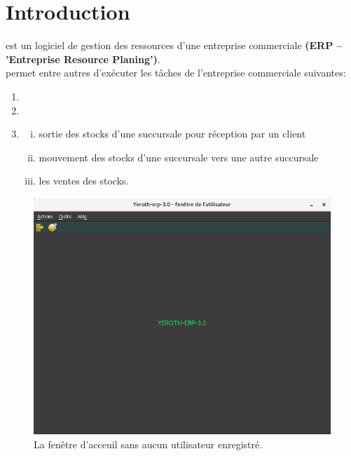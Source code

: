 \chapter{Introduction}\label{chap:introduction}

\yeren est un logiciel de gestion des ressources
d'une entreprise commerciale \textbf{(ERP -- 'Entreprise Resource
Planing')}.\\

\yeren permet entre autres d'ex\'ecuter les t\^aches de l'entreprise
commerciale suivantes:
\begin{enumerate}[1)]
	\item {}	
	\item {}
	\item {}
	\begin{enumerate}[(i)]
		\item {} sortie
			des stocks d'une succursale pour
			r\'eception par un client
		\item {} 
			mouvement des stocks d'une succursale
			vers une autre succursale			
		\item les ventes des stocks.\\
	\end{enumerate}
\end{enumerate} 


\begin{figure}[!htbp]
\centering
\includegraphics[scale=0.63]{images/yeren-fenetre-principale.png}
\caption{La fen\^etre d'acceuil sans aucun utilisateur enregistr\'e.}
\label{fig:fenetre-principale-utilisateur-non-enregistre}
\end{figure}

